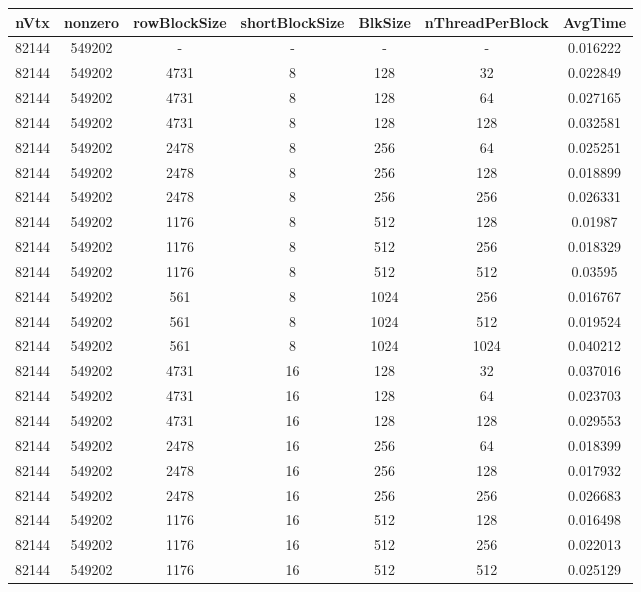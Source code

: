 \documentclass[9pt]{article}
\begin{document}
\SetBgPosition{0.25cm,-5.0cm}
\begin{tabular}{|c|c|c|c|c|c|c| }  
\hline
nVtx  & nonzero  & rowBlockSize  & shortBlockSize  & BlkSize  & nThreadPerBlock  & AvgTime \\
\hline
82144  & 549202  &  -  & -  & -  & -  &0.016222 \\
\hline
82144  & 549202  & 4731  & 8  & 128  & 32  & 0.022849 \\
\hline
82144  & 549202  & 4731  & 8  & 128  & 64  & 0.027165 \\
\hline
82144  & 549202  & 4731  & 8  & 128  & 128  & 0.032581 \\
\hline
82144  & 549202  & 2478  & 8  & 256  & 64  & 0.025251 \\
\hline
82144  & 549202  & 2478  & 8  & 256  & 128  & 0.018899 \\
\hline
82144  & 549202  & 2478  & 8  & 256  & 256  & 0.026331 \\
\hline
82144  & 549202  & 1176  & 8  & 512  & 128  & 0.01987 \\
\hline
82144  & 549202  & 1176  & 8  & 512  & 256  & 0.018329 \\
\hline
82144  & 549202  & 1176  & 8  & 512  & 512  & 0.03595 \\
\hline
82144  & 549202  & 561  & 8  & 1024  & 256  & 0.016767 \\
\hline
82144  & 549202  & 561  & 8  & 1024  & 512  & 0.019524 \\
\hline
82144  & 549202  & 561  & 8  & 1024  & 1024  & 0.040212 \\
\hline
82144  & 549202  & 4731  & 16  & 128  & 32  & 0.037016 \\
\hline
82144  & 549202  & 4731  & 16  & 128  & 64  & 0.023703 \\
\hline
82144  & 549202  & 4731  & 16  & 128  & 128  & 0.029553 \\
\hline
82144  & 549202  & 2478  & 16  & 256  & 64  & 0.018399 \\
\hline
82144  & 549202  & 2478  & 16  & 256  & 128  & 0.017932 \\
\hline
82144  & 549202  & 2478  & 16  & 256  & 256  & 0.026683 \\
\hline
82144  & 549202  & 1176  & 16  & 512  & 128  & 0.016498 \\
\hline
82144  & 549202  & 1176  & 16  & 512  & 256  & 0.022013 \\
\hline
82144  & 549202  & 1176  & 16  & 512  & 512  & 0.025129 \\

\end{tabular}
\end{document}

